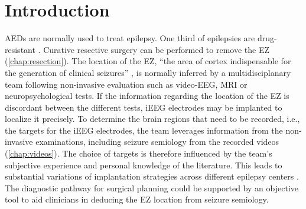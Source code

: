 \section{Introduction}

\Acp{AED} are normally used to treat epilepsy.
One third of epilepsies are drug-resistant \cite{engel_what_2016}.
Curative resective surgery can be performed to remove the \ac{EZ} (\cref{chap:resection}).
The location of the \ac{EZ}, ``the area of cortex indispensable for the generation of clinical seizures'' \cite{rosenow_presurgical_2001}, is normally inferred by a multidisciplanary team following non-invasive evaluation such as video-\ac{EEG}, \ac{MRI} or neuropsychological tests.
If the information regarding the location of the \ac{EZ} is discordant between the different tests, \ac{iEEG} electrodes may be implanted to localize it precisely.
To determine the brain regions that need to be recorded, i.e., the targets for the \ac{iEEG} electrodes, the team leverages information from the non-invasive examinations, including seizure semiology from the recorded videos (\cref{chap:videos}).
The choice of targets is therefore influenced by the team's subjective experience and personal knowledge of the literature.
This leads to substantial variations of implantation strategies across different epilepsy centers \cite{tufenkjian_seizure_2012}.
The diagnostic pathway for surgical planning could be supported by an objective tool to aid clinicians in deducing the \ac{EZ} location from seizure semiology.



